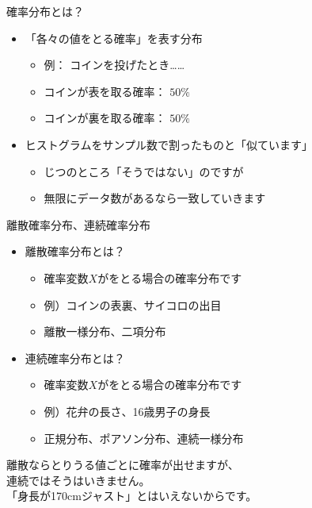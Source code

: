 \documentclass[dvipdfmx,cjk,handout]{beamer}
\begin{document}
\begin{frame}{確率分布とは？} \pause

\begin{itemize}

    \item 「各々の値をとる確率」を表す分布
        \begin{itemize}
        \item 例： コインを投げたとき……
        \item コインが表を取る確率： $50\%$
        \item コインが裏を取る確率： $50\%$  \pause
        \end{itemize}

    \item ヒストグラムをサンプル数で割ったものと「似ています」
        \begin{itemize}
        \item じつのところ「そうではない」のですが
        \item 無限にデータ数があるなら一致していきます
        \end{itemize}

\end{itemize}

\end{frame}


\begin{frame}{離散確率分布、連続確率分布} \pause

\begin{itemize}

    \item 離散確率分布とは？ \pause
        \begin{itemize}
        \item 確率変数$X$がをとる場合の確率分布です \pause
        \item 例）コインの表裏、サイコロの出目  \pause
        \item 離散一様分布、二項分布 \pause
        \end{itemize}

    \item 連続確率分布とは？ \pause
        \begin{itemize}
        \item 確率変数$X$がをとる場合の確率分布です \pause
        \item 例）花弁の長さ、16歳男子の身長 \pause
        \item 正規分布、ポアソン分布、連続一様分布 \pause
        \end{itemize}

\end{itemize}

\vskip 1cm

離散ならとりうる値ごとに確率が出せますが、\\
連続ではそうはいきません。\\ \pause
「身長が170cmジャスト」とはいえないからです。

\end{frame}
\end{document}
